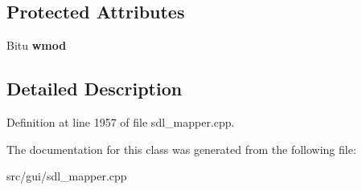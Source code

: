 \subsection*{Protected Attributes}
\begin{DoxyCompactItemize}
\item 
\hypertarget{classCModEvent_a54a25228b8da694c33c44e4b161defd9}{Bitu {\bfseries wmod}}\label{classCModEvent_a54a25228b8da694c33c44e4b161defd9}

\end{DoxyCompactItemize}


\subsection{Detailed Description}


Definition at line 1957 of file sdl\-\_\-mapper.\-cpp.



The documentation for this class was generated from the following file\-:\begin{DoxyCompactItemize}
\item 
src/gui/sdl\-\_\-mapper.\-cpp\end{DoxyCompactItemize}
